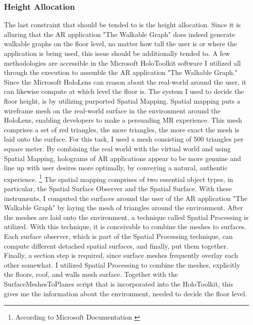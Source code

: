\documentclass[12pt,a4paper,oneside,american,parskip=half]{article}
\begin{document}
\begin{justify}
\begin{normalsize}
\subsubsection{Height Allocation}
The last constraint that should be tended to is the height allocation. Since it is alluring that the AR application "The Walkable Graph" does indeed generate walkable graphs on the floor level, no matter how tall the user is or where the application is being used, this issue should be additionally tended to. 
A few methodologies are accessible in the Microsoft HoloToolkit software I utilized all through the execution to assemble the AR application "The Walkable Graph." 
Since the Microsoft HoloLens can reason about the real-world around the user, it can likewise compute at which level the floor is.
The system I used to decide the floor height, is by utilizing purported Spatial Mapping. Spatial mapping puts a wireframe mesh on the real-world surface in the environment around the HoloLens, enabling developers to make a persuading MR experience. This mesh comprises a set of red triangles, the more triangles, the more exact the mesh is laid onto the surface. For this task, I used a mesh consisting of 500 triangles per square meter. By combining the real world with the virtual world and using Spatial Mapping, holograms of AR applications appear to be more genuine and line up with user desires more optimally, by conveying a natural, authentic experience.  \footnote{According to Microsoft Documentation \cite{mapping}}
The spatial mapping comprises of two essential object types, in particular, the Spatial Surface Observer and the Spatial Surface. With these instruments, I computed the surfaces around the user of the AR application "The Walkable Graph" by laying the mesh of triangles around the environment.
\newline
After the meshes are laid onto the environment, a technique called Spatial Processing is utilized. With this technique, it is conceivable to combine the meshes to surfaces. Each surface observer, which is part of the Spatial Processing technique, can compute different detached spatial surfaces,  and finally, put them together. Finally, a section step is required, since surface meshes frequently overlay each other somewhat. 
\newline
I utilized Spatial Processing to combine the meshes, explicitly the floors, roof, and walls mesh surface. Together with the SurfaceMeshesToPlanes script that is incorporated into the HoloToolkit, this gives me the information about the environment, needed to decide the floor level. 

\end{normalsize}
\end{justify}
\end{document}

